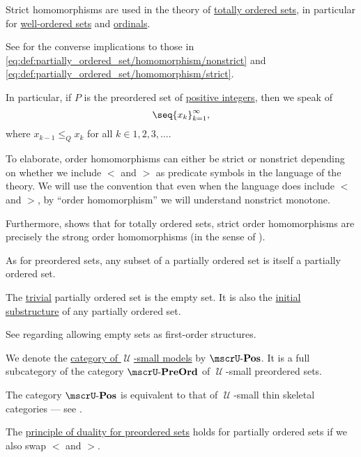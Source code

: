 \begin{definition}
\begin{thmenum}[resume=def:partially_ordered_set]
    Strict homomorphisms are used in the theory of \hyperref[subsec:partially_ordered_sets]{totally ordered sets}, in particular for \hyperref[subsec:well_ordered_sets]{well-ordered sets} and \hyperref[subsec:ordinals]{ordinals}.

    See  for the converse implications to those in \eqref{eq:def:partially_ordered_set/homomorphism/nonstrict} and \eqref{eq:def:partially_ordered_set/homomorphism/strict}.

    In particular, if \( P \) is the preordered set of \hyperref[def:integer_signum]{positive integers}, then we speak of 
    \begin{equation}\label{eq:def:partially_ordered_set/homomorphism/sequence}
      \seq{ x_k }_{k=1}^\infty,
    \end{equation}
    where \( x_{k-1} \leq_Q x_k \) for all \( k \in 1, 2, 3, \ldots \).

    To elaborate, order homomorphisms can either be strict or nonstrict depending on whether we include \( < \) and \( > \) as predicate symbols in the language of the theory. We will use the convention that even when the language does include \( < \) and \( > \), by \enquote{order homomorphism} we will understand nonstrict monotone.

    Furthermore,  shows that for totally ordered sets, strict order homomorphisms are precisely the strong order homomorphisms (in the sense of ).

     As for preordered sets, any subset of a partially ordered set is itself a partially ordered set.

     The \hyperref[def:trivial_structure]{trivial} partially ordered set is the empty set. It is also the \hyperref[thm:substructures_form_complete_lattice/bottom]{initial substructure} of any partially ordered set.

    See  regarding allowing empty sets as first-order structures.

     We denote the \hyperref[def:category_of_small_first_order_models]{category of \( \mscrU \)-small models} by \( \ucat{Pos} \). It is a full subcategory of the category \hyperref[def:preordered_set/category]{\( \ucat{PreOrd} \)} of \( \mscrU \)-small preordered sets.

    The category \( \ucat{Pos} \) is equivalent to that of \( \mscrU \)-small thin skeletal categories --- see .

     The \hyperref[def:preordered_set/duality]{principle of duality for preordered sets} holds for partially ordered sets if we also swap \( < \) and \( > \).
  \end{thmenum}
\end{definition}
